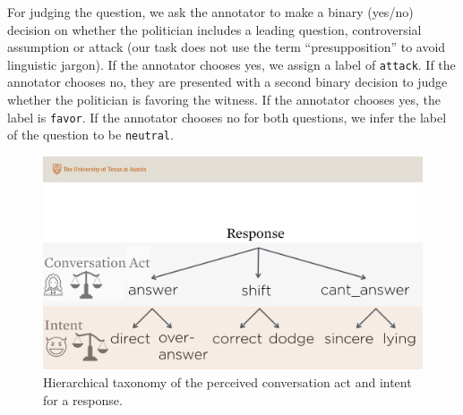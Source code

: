 For judging the question, we ask the annotator to make a binary (yes/no) decision on whether the politician includes a leading question, controversial assumption or attack (our task does not use the term ``presupposition'' to avoid linguistic jargon). If the annotator chooses yes, we assign a label of \texttt{attack}. If the annotator chooses no, they are presented with a second binary decision to judge whether the politician is favoring the witness. If the annotator chooses yes, the label is \texttt{favor}. If the annotator chooses no for both questions, we infer the label of the question to be \texttt{neutral}. 

\begin{figure}[t]
\centering
\vspace{-1.0em}
\includegraphics[scale=0.12]{plots/response_taxonomy.pdf}
\vspace{-0.5em}
\caption{Hierarchical taxonomy of the perceived conversation act and intent for a response.}
\label{fig:response_taxonomy}
\end{figure}

